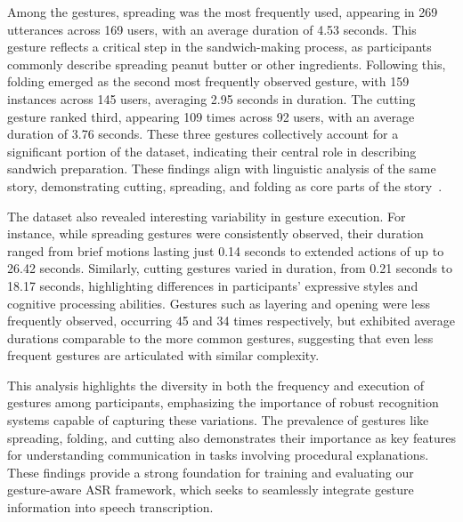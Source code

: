 Among the gestures, spreading was the most frequently used, appearing in 269 utterances across 169 users, with an average duration of 4.53 seconds. This gesture reflects a critical step in the sandwich-making process, as participants commonly describe spreading peanut butter or other ingredients. Following this, folding emerged as the second most frequently observed gesture, with 159 instances across 145 users, averaging 2.95 seconds in duration. The cutting gesture ranked third, appearing 109 times across 92 users, with an average duration of 3.76 seconds. These three gestures collectively account for a significant portion of the dataset, indicating their central role in describing sandwich preparation. These findings align with linguistic analysis of the same story, demonstrating cutting, spreading, and folding as core parts of the story~\cite{dalton2020compendium}.

The dataset also revealed interesting variability in gesture execution. For instance, while spreading gestures were consistently observed, their duration ranged from brief motions lasting just 0.14 seconds to extended actions of up to 26.42 seconds. Similarly, cutting gestures varied in duration, from 0.21 seconds to 18.17 seconds, highlighting differences in participants’ expressive styles and cognitive processing abilities. Gestures such as layering and opening were less frequently observed, occurring 45 and 34 times respectively, but exhibited average durations comparable to the more common gestures, suggesting that even less frequent gestures are articulated with similar complexity.

This analysis highlights the diversity in both the frequency and execution of gestures among participants, emphasizing the importance of robust recognition systems capable of capturing these variations. The prevalence of gestures like spreading, folding, and cutting also demonstrates their importance as key features for understanding communication in tasks involving procedural explanations. These findings provide a strong foundation for training and evaluating our gesture-aware ASR framework, which seeks to seamlessly integrate gesture information into speech transcription.



